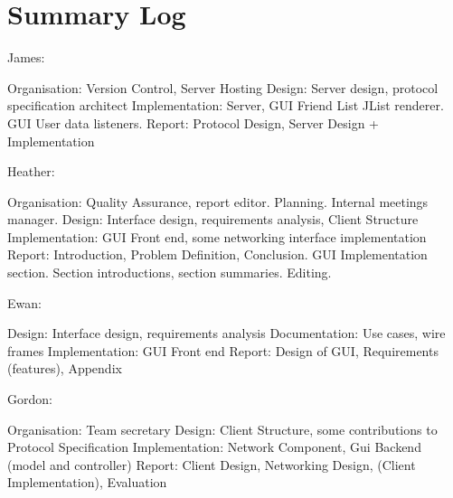 \section{Summary Log}
\label{sumlog}

James:

Organisation: Version Control, Server Hosting
Design: Server design, protocol specification architect
Implementation: Server, GUI Friend List JList renderer. GUI User data listeners.
Report: Protocol Design, Server Design + Implementation

Heather:

Organisation: Quality Assurance, report editor. Planning. Internal meetings manager.
Design: Interface design, requirements analysis, Client Structure
Implementation: GUI Front end, some networking interface implementation
Report: Introduction, Problem Definition, Conclusion. GUI Implementation section. Section introductions, section summaries. Editing. 

Ewan:

Design: Interface design, requirements analysis
Documentation: Use cases, wire frames
Implementation: GUI Front end
Report: Design of GUI, Requirements (features), Appendix 

Gordon:

Organisation: Team secretary
Design: Client Structure, some contributions to Protocol Specification
Implementation: Network Component, Gui Backend (model and controller)
Report: Client Design, Networking Design, (Client Implementation), Evaluation
